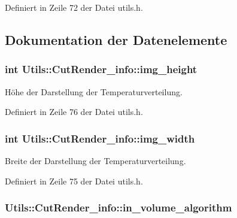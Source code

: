 Definiert in Zeile 72 der Datei utils.\-h.



\subsection{Dokumentation der Datenelemente}
\hypertarget{structUtils_1_1CutRender__info_abac1c3e4edb7183017ecfa7b69c40d25}{
\subsubsection[{img\-\_\-height}]{\setlength{\rightskip}{0pt plus 5cm}int Utils\-::\-Cut\-Render\-\_\-info\-::img\-\_\-height}}\label{structUtils_1_1CutRender__info_abac1c3e4edb7183017ecfa7b69c40d25}


Höhe der Darstellung der Temperaturverteilung. 



Definiert in Zeile 76 der Datei utils.\-h.

\hypertarget{structUtils_1_1CutRender__info_ac7a1e2c64129630affaf208808a190eb}{
\subsubsection[{img\-\_\-width}]{\setlength{\rightskip}{0pt plus 5cm}int Utils\-::\-Cut\-Render\-\_\-info\-::img\-\_\-width}}\label{structUtils_1_1CutRender__info_ac7a1e2c64129630affaf208808a190eb}


Breite der Darstellung der Temperaturverteilung. 



Definiert in Zeile 75 der Datei utils.\-h.

\hypertarget{structUtils_1_1CutRender__info_af2ee1118ac14a73a2a350a05102013ab}{
\subsubsection[{in\-\_\-volume\-\_\-algorithm}]{ Utils\-::\-Cut\-Render\-\_\-info\-::in\-\_\-volume\-\_\-algorithm}}\label{structUtils_1_1CutRender__info_af2ee1118ac14a73a2a350a05102013ab}


